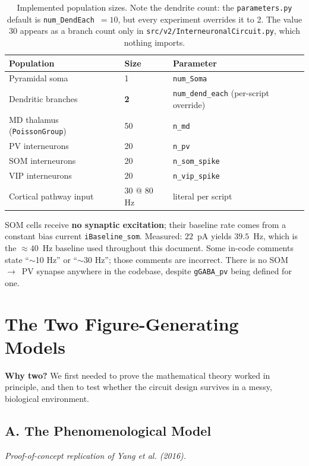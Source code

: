 \documentclass[11pt,a4paper]{article}
\begin{document}
\begin{table}[H]
    \centering
    \small
    \begin{tabular}{@{}lll@{}}
    \toprule
    \textbf{Population} & \textbf{Size} & \textbf{Parameter} \\ \midrule
    Pyramidal soma                & 1           & \texttt{num\_Soma} \\
    Dendritic branches            & \textbf{2}  & \texttt{num\_dend\_each} (per-script override) \\
    MD thalamus (\texttt{PoissonGroup}) & 50    & \texttt{n\_md} \\
    PV interneurons               & 20          & \texttt{n\_pv} \\
    SOM interneurons              & 20          & \texttt{n\_som\_spike} \\
    VIP interneurons              & 20          & \texttt{n\_vip\_spike} \\
    Cortical pathway input        & 30 @ 80 Hz  & literal per script \\ \bottomrule
    \end{tabular}
    \caption{Implemented population sizes. Note the dendrite count: the
    \texttt{parameters.py} default is \texttt{num\_DendEach}~$=10$, but every experiment
    overrides it to 2. The value 30 appears as a branch count only in
    \texttt{src/v2/InterneuronalCircuit.py}, which nothing imports.}
\end{table}

SOM cells receive \textbf{no synaptic excitation}; their baseline rate comes from a
constant bias current \texttt{iBaseline\_som}. Measured: $22$~pA yields
$39.5$~Hz, which is the $\approx 40$~Hz baseline used throughout this document.
Some in-code comments state ``$\sim$10 Hz'' or ``$\sim$30 Hz''; those comments are
incorrect. There is no SOM~$\rightarrow$~PV synapse anywhere in the codebase, despite
\texttt{gGABA\_pv} being defined for one.

\section{The Two Figure-Generating Models}
\textbf{Why two?} We first needed to prove the mathematical theory worked in principle,
and then to test whether the circuit design survives in a messy, biological
environment.

\subsection{A. The Phenomenological Model}
\textit{Proof-of-concept replication of Yang et al. (2016).}
\end{document}
